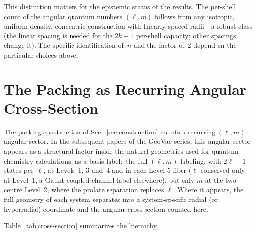 \documentclass[aps,prl,reprint,amsmath,amssymb]{revtex4-2}
\begin{document}
This distinction matters for the epistemic status of the results.  The
per-shell count of the angular quantum numbers $(\ell, m)$ follows from any isotropic,
uniform-density, concentric construction with linearly spaced radii---a
robust class (the linear spacing is needed for the $2k-1$ per-shell
capacity; other spacings change it).  The
specific identification of~$n$ and the factor of~2 depend on the
particular choices above.


\section{The Packing as Recurring Angular Cross-Section}
\label{sec:cross-section}

The packing construction of Sec.~\ref{sec:construction} counts a
recurring $(\ell, m)$ angular sector.  In the subsequent papers of
the GeoVac series, this angular sector appears as a structural factor
inside the natural geometries used for quantum chemistry calculations,
as a basis label:\ the full $(\ell, m)$ labeling, with $2\ell+1$ states
per~$\ell$, at Levels~1, 3 and~4 and in each Level-5 fiber ($\ell$
conserved only at Level~1, a Gaunt-coupled channel label elsewhere), but
only $m$ at the two-centre Level~2, where the prolate separation replaces
$\ell$.  Where it appears, the full geometry of each system separates into a
system-specific radial (or hyperradial) coordinate and the angular
cross-section counted here.

Table~\ref{tab:cross-section} summarizes the hierarchy.
\end{document}
